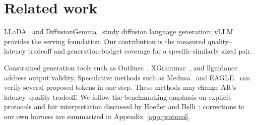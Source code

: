 \section{Related work}
\label{sec:related}

LLaDA~\cite{llada2025} and DiffusionGemma~\cite{diffusiongemma} study
diffusion language generation; vLLM~\cite{vllm2023} provides the serving
foundation. Our contribution is the measured quality--latency tradeoff
and generation-budget coverage for a specific similarly sized pair.

Constrained generation tools such as Outlines~\cite{outlines2024},
XGrammar~\cite{xgrammar2024}, and llguidance~\cite{llguidance} address
output validity. Speculative methods such as Medusa~\cite{medusa2024}
and EAGLE~\cite{eagle2024} can verify several proposed tokens in one step.
These methods may change AR's latency--quality tradeoff. We follow the
benchmarking emphasis on explicit protocols and fair interpretation
discussed by Hoefler and Belli~\cite{hoefler2015}; corrections to our own
harness are summarized in Appendix~\ref{app:protocol}.
